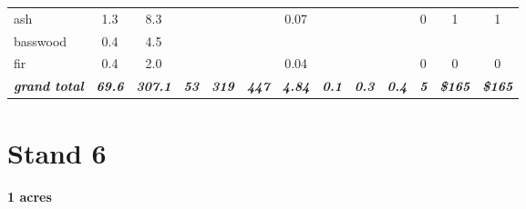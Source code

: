 \documentclass[landscape]{article}
\begin{document}
\begin{table}[H]
\begin{tabular}[t]{lcccccccccccc}
\rowcolor{gray!6}  ash & 1.3 & 8.3 &  &  &  & 0.07 &  &  &  & 0 & 1 & 1\\
 
basswood & 0.4 & 4.5 &  &  &  &  &  &  &  &  &  & \\
 
\rowcolor{gray!6}  fir & 0.4 & 2.0 &  &  &  & 0.04 &  &  &  & 0 & 0 & 0\\
 
\rowcolor[HTML]{DCDCDC}  \em{\textbf{grand total}} & \em{\textbf{69.6}} & \em{\textbf{307.1}} & \em{\textbf{53}} & \em{\textbf{319}} & \em{\textbf{447}} & \em{\textbf{4.84}} & \em{\textbf{0.1}} & \em{\textbf{0.3}} & \em{\textbf{0.4}} & \em{\textbf{5}} & \em{\textbf{\$165}} & \em{\textbf{\$165}}\\
\bottomrule
\end{tabular}
\end{table}

\pagebreak

\section{Stand 6}\label{stand-6}

\textbf{1 acres}
\end{document}
